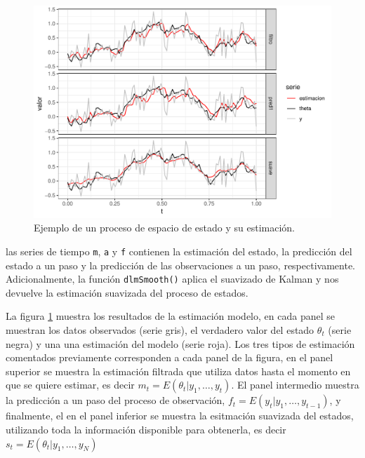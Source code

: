 \documentclass[12pt]{article}\usepackage[]{graphicx}\usepackage[]{color}
\makeatletter
\def\maxwidth{ %
  \ifdim\Gin@nat@width>\linewidth
    \linewidth
  \else
    \Gin@nat@width
  \fi
}
\newenvironment{knitrout}{}{} %
\makeatother
\begin{document}
\begin{knitrout}
\color{fgcolor}\begin{figure}

{\centering \includegraphics[width=\maxwidth]{figure/graf7b-1} 

}

\caption[Ejemplo de un proceso de espacio de estado y su estimación]{Ejemplo de un proceso de espacio de estado y su estimación.}\label{fig:graf7b}
\end{figure}


\end{knitrout}
las series de tiempo \verb|m|, \verb|a| y \verb|f| contienen la estimación del estado, la predicción del estado a un paso y la predicción de las observaciones a un paso, respectivamente. Adicionalmente, la función \verb|dlmSmooth()| aplica el suavizado de Kalman y nos devuelve la estimación suavizada del proceso de estados.

La figura \ref{fig:graf7b} muestra los resultados de la estimación modelo, en cada panel se muestran los datos observados (serie gris), el verdadero valor del estado $\theta_t$ (serie negra) y una una estimación del modelo (serie roja). Los tres tipos de estimación comentados previamente corresponden a cada panel de la figura, en el panel superior se muestra la estimación filtrada que utiliza datos hasta el momento en que se quiere estimar, es decir $m_t = E(\theta_t | y_1,\ldots, y_t)$. El panel intermedio muestra la predicción a un paso del proceso de observación, $f_t = E(y_t | y_1, \ldots, y_{t-1})$, y finalmente, el en el panel inferior se muestra la esitmación suavizada del estados, utilizando toda la información disponible para obtenerla, es decir $s_t = E(\theta_t | y_1, \ldots, y_N)$
\end{document}

